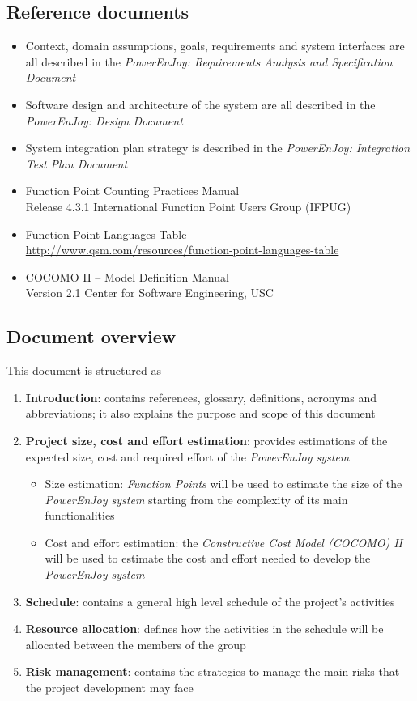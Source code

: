 \subsection{Reference documents}
\begin{itemize}
	\item Context, domain assumptions, goals, requirements and system interfaces are all described in the \emph{PowerEnJoy: Requirements Analysis and Specification Document} \cite{RASD}
	\item Software design and architecture of the system are all described in the \emph{PowerEnJoy: Design Document} \cite{DD}
	\item System integration plan strategy is described in the \emph{PowerEnJoy: Integration Test Plan Document} \cite{ITPD}
	\item Function Point Counting Practices Manual \\ 
Release 4.3.1 International Function Point Users Group (IFPUG)
	\item Function Point Languages Table \\ 
\url{http://www.qsm.com/resources/function-point-languages-table}
	\item COCOMO II – Model Definition Manual \\
Version 2.1 Center for Software Engineering, USC

\end{itemize}


\subsection{Document overview}
This document is structured as
\begin{enumerate}
	\item \textbf{Introduction}: contains references, glossary, definitions, acronyms and abbreviations; it also explains the purpose and scope of this document
	\item \textbf{Project size, cost and effort estimation}: provides estimations of the expected size, cost and required effort of the \emph{PowerEnJoy system}
	\begin{itemize}
		\item Size estimation: \emph{Function Points} will be used to estimate the size of the \emph{PowerEnJoy system} starting from the complexity of its main functionalities
		\item Cost and effort estimation: the \emph{Constructive Cost Model (COCOMO) II} will be used to estimate the cost and effort needed to develop the \emph{PowerEnJoy system}
	\end{itemize}
	\item \textbf{Schedule}: contains a general high level schedule of the project's activities
	\item \textbf{Resource allocation}: defines how the activities in the schedule will be allocated between the members of the group
	\item \textbf{Risk management}: contains the strategies to manage the main risks that the project development may face
\end{enumerate}
